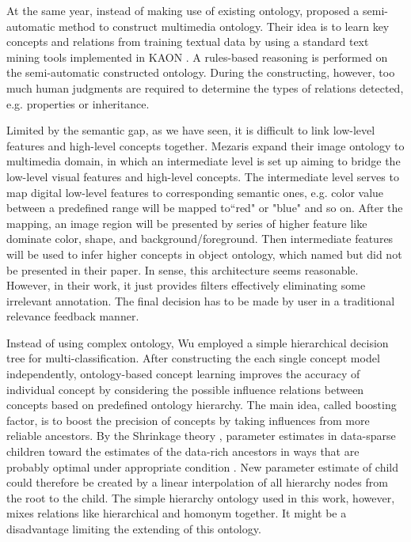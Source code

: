 At the same year, instead of making use of existing ontology,
\cite{Alejandro.Jaimes:ICOIVR:2003,Alejandro.Jaimes:IEEEICOME:2003}
proposed a semi-automatic method to construct multimedia ontology.
Their idea is to learn key concepts and relations from training
textual data by using a standard text mining tools implemented in
KAON \cite{A.Maedche:IEEEDEB:2002}. A rules-based reasoning is
performed on the semi-automatic constructed ontology. During the
constructing, however, too much human judgments are required to
determine the types of relations detected, e.g. properties or
inheritance.

Limited by the semantic gap, as we have seen, it is difficult to
link low-level features and high-level concepts together. Mezaris
\cite{Mezaris:IEEETCSVT:2004} expand their image ontology
\cite{Mezaris:ICIP:2003} to multimedia domain, in which an
intermediate level is set up aiming to bridge the low-level visual
features and high-level concepts. The intermediate level serves to
map digital low-level features to corresponding semantic ones, e.g.
color value between a predefined range will be mapped to``red" or
"blue" and so on. After the mapping, an image region will be
presented by series of higher feature like dominate color, shape,
and background/foreground. Then intermediate features will be used
to infer higher concepts in object ontology, which named but did not
be presented in their paper. In sense, this architecture seems
reasonable. However, in their work, it just provides filters
effectively eliminating some irrelevant annotation. The final
decision has to be made by user in a traditional relevance feedback
manner.

Instead of using complex ontology, Wu \cite{Yi.Wu:IEEEICOME:2004}
employed a simple hierarchical decision tree for
multi-classification. After constructing the each single concept
model independently, ontology-based concept learning improves the
accuracy of individual concept by considering the possible influence
relations between concepts based on predefined ontology hierarchy.
The main idea, called boosting factor, is to boost the precision of
concepts by taking influences from more reliable ancestors. By the
Shrinkage theory \cite{Andrew.McCallum:ICML:1998}, parameter
estimates in data-sparse children toward the estimates of the
data-rich ancestors in ways that are probably optimal under
appropriate condition \cite{Yi.Wu:IEEEICOME:2004}. New parameter
estimate of child could therefore be created by a linear
interpolation of all hierarchy nodes from the root to the child. The
simple hierarchy ontology used in this work, however, mixes
relations like hierarchical and homonym together. It might be a
disadvantage limiting the extending of this ontology.

